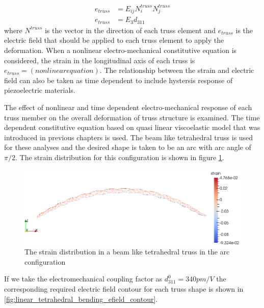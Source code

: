 \begin{equation}
\begin{aligned}
e_{truss} &= E_{ij}N^{truss}_i N^{truss}_j \\
e_{truss} &=E_3 d_{311} 
\end{aligned}
\label{electric_field_in_each_truss:eqn}
\end{equation}
where 
$N^{truss}$ is the vector in the direction of each truss element and 
$e_{truss}$ is the electric field that should be applied to each truss element to apply the deformation.
When a nonlinear electro-mechanical constitutive equation is considered, the strain in the longitudinal axis of each truss is $e_{truss}=(nonlinear equation)$.
The relationship between the strain and electric field can also be taken as time dependent to include hystersis response of piezoelectric materials.

The effect of nonlinear and time dependent electro-mechanical response of each truss member on the overall deformation of truss structure is examined.
The time dependent constitutive equation based on quasi linear viscoelastic model that was introduced in previous chapters is used.
The beam like tetrahedral truss is used for these analyses and the desired shape is taken to be an arc with arc angle of $\pi/2$.
The strain distribution for this configuration is shown in figure \ref{fig:linear_tetrahedral_bending_strain_contour}.
\begin{figure} 
\centering
\includegraphics[width=5.0in]{./chap_5_active_trusses/images_non_linear_time_dependent_constitutive_equatio/linear_tetrahedral_bending_strain_contour.png}
\caption{The strain distribution in a beam like tetrahedral truss in the arc configuration}
\label{fig:linear_tetrahedral_bending_strain_contour}
\end{figure} 
If we take the electromechanical coupling factor as $d_{311}^0=340pm/V$ the corresponding required electric field contour for each truss shape is shown in \ref{fig:linear_tetrahedral_bending_efield_contour}.

